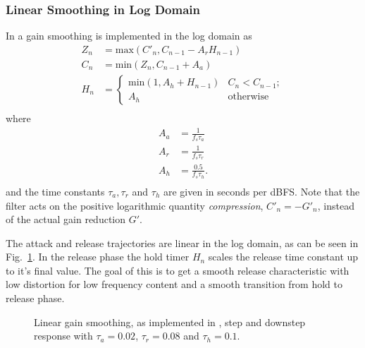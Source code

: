 \documentclass[../main2.tex]{subfiles}
\providecommand{\rootdir}{..}
\begin{document}
\subsubsection{Linear Smoothing in Log Domain}
In \cite{frindle1996implementation} a gain smoothing is implemented in the log domain as
\begin{equation}\label{eq:frindle_gainsmooth}
\begin{split}
Z_n &= \text{max}(C'_n, C_{n-1} - A_r H_{n-1} )\\
C_n &= \text{min}(Z_n, C_{n-1} + A_a) \\
H_n &=
\begin{cases}
    \text{min}(1,A_h + H_{n-1})	& C_n < C_{n-1}; \\
    A_h					& \text{otherwise}
\end{cases} \\
\end{split}
\end{equation}
where
\begin{equation}
\begin{split}
A_a &= \frac{1}{f_s \tau_a} \\
A_r &= \frac{1}{f_s \tau_r} \\
A_h &= \frac{0.5}{f_s \tau_h}. \\
\end{split}
\end{equation}
and the time constants $\tau_a, \tau_r$ and $\tau_h$ are given in seconds per dBFS. Note that the filter acts on the positive logarithmic quantity \emph{compression}, $C'_n = -G'_n$, instead of the actual gain reduction $G'$.

The attack and release trajectories are linear in the log domain, as can be seen in Fig.~\ref{fig:step_frindle_gain}. In the release phase the hold timer $H_n$ scales the release time constant up to it's final value. The goal of this is to get a smooth release characteristic with low distortion for low frequency content and a smooth transition from hold to release phase.
\begin{figure}[h]
\centerline{}
\caption{Linear gain smoothing, as implemented in \cite{frindle1996implementation}, step and downstep response with $\tau_a=0.02$, $\tau_r=0.08$ and $\tau_h= 0.1$.}
\label{fig:step_frindle_gain}
\end{figure}
\end{document}
